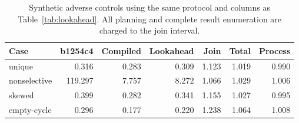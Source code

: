 \begin{table}[ht]
\caption{Synthetic adverse controls using the same protocol and columns as Table~\ref{tab:lookahead}. All planning and complete result enumeration are charged to the join interval.}
\label{tab:lookahead-controls}
\centering\small
\begin{tabular}{@{}lrrrrrr@{}}
\toprule
Case & b1254c4 & Compiled & Lookahead & Join & Total & Process \\
\midrule
unique & 0.316 & 0.283 & 0.309 & 1.123 & 1.019 & 0.990 \\
nonselective & 119.297 & 7.757 & 8.272 & 1.066 & 1.029 & 1.006 \\
skewed & 0.399 & 0.282 & 0.341 & 1.155 & 1.027 & 0.995 \\
empty-cycle & 0.296 & 0.177 & 0.220 & 1.238 & 1.064 & 1.008 \\
\bottomrule
\end{tabular}
\end{table}
